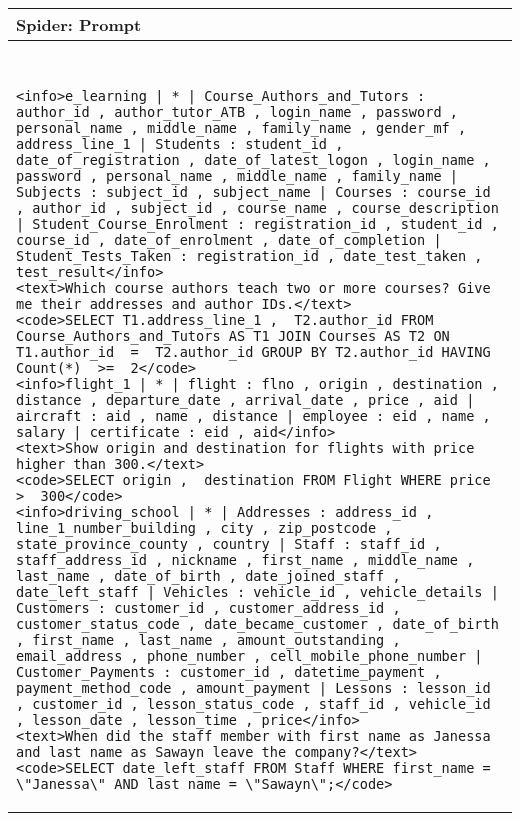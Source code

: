 \documentclass[11pt]{article}
\begin{document}
\begin{table*}[t]
    \centering \small
    \begin{tabular}{p{}}
    \toprule
    \textbf{Spider: Prompt} \\
    \midrule ~\\[-22pt]
    \begin{lstlisting}
<info>e_learning | * | Course_Authors_and_Tutors : author_id , author_tutor_ATB , login_name , password , personal_name , middle_name , family_name , gender_mf , address_line_1 | Students : student_id , date_of_registration , date_of_latest_logon , login_name , password , personal_name , middle_name , family_name | Subjects : subject_id , subject_name | Courses : course_id , author_id , subject_id , course_name , course_description | Student_Course_Enrolment : registration_id , student_id , course_id , date_of_enrolment , date_of_completion | Student_Tests_Taken : registration_id , date_test_taken , test_result</info>
<text>Which course authors teach two or more courses? Give me their addresses and author IDs.</text>
<code>SELECT T1.address_line_1 ,  T2.author_id FROM Course_Authors_and_Tutors AS T1 JOIN Courses AS T2 ON T1.author_id  =  T2.author_id GROUP BY T2.author_id HAVING Count(*)  >=  2</code>
<info>flight_1 | * | flight : flno , origin , destination , distance , departure_date , arrival_date , price , aid | aircraft : aid , name , distance | employee : eid , name , salary | certificate : eid , aid</info>
<text>Show origin and destination for flights with price higher than 300.</text>
<code>SELECT origin ,  destination FROM Flight WHERE price  >  300</code>
<info>driving_school | * | Addresses : address_id , line_1_number_building , city , zip_postcode , state_province_county , country | Staff : staff_id , staff_address_id , nickname , first_name , middle_name , last_name , date_of_birth , date_joined_staff , date_left_staff | Vehicles : vehicle_id , vehicle_details | Customers : customer_id , customer_address_id , customer_status_code , date_became_customer , date_of_birth , first_name , last_name , amount_outstanding , email_address , phone_number , cell_mobile_phone_number | Customer_Payments : customer_id , datetime_payment , payment_method_code , amount_payment | Lessons : lesson_id , customer_id , lesson_status_code , staff_id , vehicle_id , lesson_date , lesson_time , price</info>
<text>When did the staff member with first name as Janessa and last name as Sawayn leave the company?</text>
<code>SELECT date_left_staff FROM Staff WHERE first_name = \"Janessa\" AND last_name = \"Sawayn\";</code>

\end{lstlisting}
\end{tabular}
\end{table*}
\end{document}
